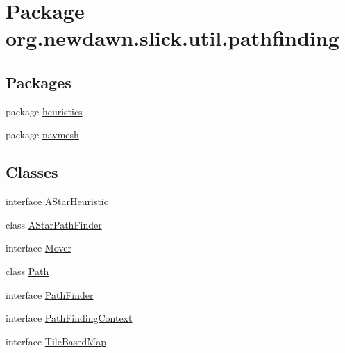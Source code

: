 \hypertarget{namespaceorg_1_1newdawn_1_1slick_1_1util_1_1pathfinding}{}\section{Package org.\+newdawn.\+slick.\+util.\+pathfinding}
\label{namespaceorg_1_1newdawn_1_1slick_1_1util_1_1pathfinding}
\subsection*{Packages}
\begin{DoxyCompactItemize}
\item 
package \mbox{\hyperlink{namespaceorg_1_1newdawn_1_1slick_1_1util_1_1pathfinding_1_1heuristics}{heuristics}}
\item 
package \mbox{\hyperlink{namespaceorg_1_1newdawn_1_1slick_1_1util_1_1pathfinding_1_1navmesh}{navmesh}}
\end{DoxyCompactItemize}
\subsection*{Classes}
\begin{DoxyCompactItemize}
\item 
interface \mbox{\hyperlink{interfaceorg_1_1newdawn_1_1slick_1_1util_1_1pathfinding_1_1_a_star_heuristic}{A\+Star\+Heuristic}}
\item 
class \mbox{\hyperlink{classorg_1_1newdawn_1_1slick_1_1util_1_1pathfinding_1_1_a_star_path_finder}{A\+Star\+Path\+Finder}}
\item 
interface \mbox{\hyperlink{interfaceorg_1_1newdawn_1_1slick_1_1util_1_1pathfinding_1_1_mover}{Mover}}
\item 
class \mbox{\hyperlink{classorg_1_1newdawn_1_1slick_1_1util_1_1pathfinding_1_1_path}{Path}}
\item 
interface \mbox{\hyperlink{interfaceorg_1_1newdawn_1_1slick_1_1util_1_1pathfinding_1_1_path_finder}{Path\+Finder}}
\item 
interface \mbox{\hyperlink{interfaceorg_1_1newdawn_1_1slick_1_1util_1_1pathfinding_1_1_path_finding_context}{Path\+Finding\+Context}}
\item 
interface \mbox{\hyperlink{interfaceorg_1_1newdawn_1_1slick_1_1util_1_1pathfinding_1_1_tile_based_map}{Tile\+Based\+Map}}
\end{DoxyCompactItemize}
